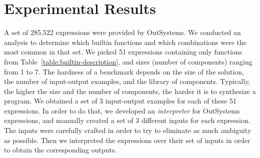 \section{Experimental Results}
\label{sec:experimental-results}

\begin{table}[t]
  \footnotesize
  \noindent{}
  \caption{Comparison between the different configurations by number of instances
    solved and running wall-clock time for solved instances (not necessarily
    matching the expected solution).}
  \label{table:comparison-configs}
\end{table}


A set of 285,522 expressions were provided by OutSystems.
We conducted an analysis to determine which builtin functions and which
combinations were the most common in that set.
We picked 51 expressions containing only functions from
Table~\ref{table:builtin-description}, and sizes (number of components) ranging
from 1 to 7.
The hardness of a benchmark depends on the size of the solution, the number of
input-output examples, and the library of components.
Typically, the higher the size and the number of components, the harder it is to
synthesize a program.
We obtained a set of 3 input-output examples for each of these 51 expressions.
In order to do that, we developed an \textit{interpreter} for OutSystems
expressions, and manually created a set of 3 different inputs for each
expression.
The inputs were carefully crafted in order to try to eliminate as much ambiguity
as possible.
Then we interpreted the expressions over their set of inputs in order to
obtain the corresponding outputs.

